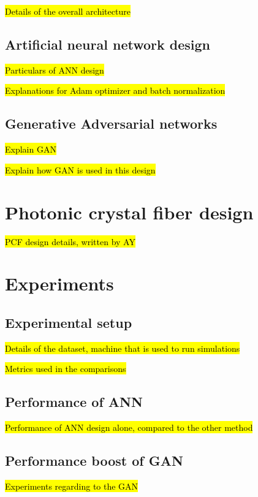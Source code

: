 \documentclass[draft, a4, 10pt, onecolumn]{IEEEtran}
\begin{document}
\hl{Details of the overall architecture}

\subsection{Artificial neural network design}
\label{ssec:ann}

\hl{Particulars of ANN design}

\hl{Explanations for Adam optimizer and batch normalization} 

\subsection{Generative Adversarial networks}
\label{ssec:gan}

\hl{Explain GAN}

\hl{Explain how GAN is used in this design}



\section{Photonic crystal fiber design}
\label{sec:pcf}

\hl{PCF design details, written by AY}

\section{Experiments}
\label{sec:exp}

\subsection{Experimental setup}

\hl{Details of the dataset, machine that is used to run simulations}

\hl{Metrics used in the comparisons}


\subsection{Performance of ANN}

\hl{Performance of ANN design alone, compared to the other method}

\subsection{Performance boost of GAN}

\hl{Experiments regarding to the GAN}
\end{document}

